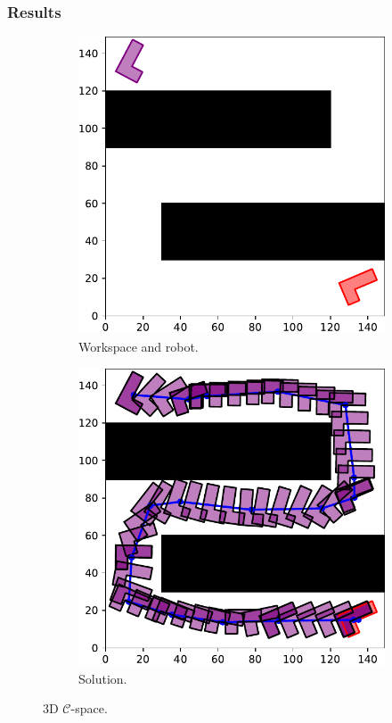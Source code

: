 \documentclass{beamer}
\begin{document}
\begin{frame}
	\frametitle{Results}	
	\begin{figure}[!ht]
		\centering 
		\begin{subfigure}[t]{0.49\textwidth}
			\includegraphics[width=\textwidth]{figChap5/Maze_E_2D.pdf}
			\caption{Workspace and robot.} 
		\end{subfigure}
		\begin{subfigure}[t]{0.49\textwidth}
		  \includegraphics[width=\textwidth]{figChap5/RRTstar_ML_Maze_E_2D_solution.pdf}
		  \caption{Solution.} 
	  \end{subfigure}    
		\caption{3D $\mathcal{C}$-space.} 
	  \end{figure}
\end{frame}	
\end{document}

